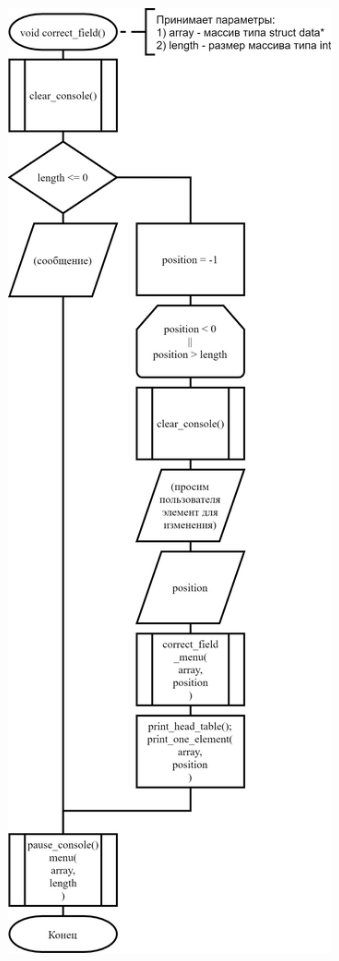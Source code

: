 \begin{figure}[!htp]
    \includegraphics[height=25cm]{../../Makefile-project/src/menu/correct_field/correct_field-1.png}
\end{figure}
